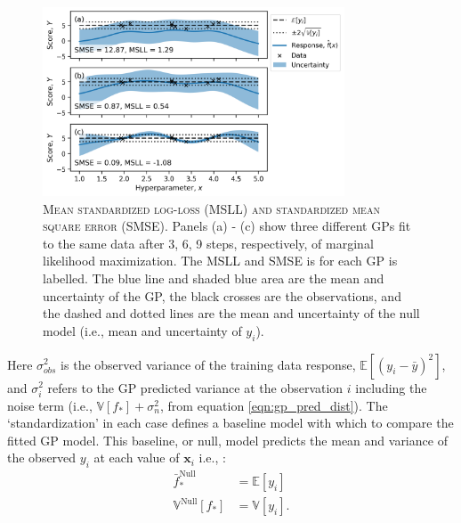 \begin{figure}
    \centering

    \includegraphics[width=0.8\textwidth]{chapters/msm_optimization/figures/gp_metric_explainer.png}
    \caption[Mean standardized log-loss (MSLL) and standardized mean square error (SMSE)]{\textsc{Mean standardized log-loss (MSLL) and standardized mean square error (SMSE)}. Panels (a) - (c) show three different GPs fit to the same data after 3, 6, 9 steps, respectively, of marginal likelihood maximization. The MSLL and SMSE is for each GP is labelled. The blue line and shaded blue area are the mean and uncertainty of the GP, the black crosses are the observations, and the dashed and dotted lines are the mean and uncertainty of the null model (i.e., mean and uncertainty of $y_{i}$).}
    \label{fig:msm_gp_metric_explainer}
\end{figure}

Here $\sigma_{obs}^{2}$ is the observed variance of the training data response, $\mathbb{E}\left[(y_{i}-\bar{y})^{2}\right]$, and $\sigma_{i}^{2}$ refers to the GP predicted variance at the observation $i$ including the noise term (i.e., $\mathbb{V}\left[f_{*}\right]+\sigma_{n}^{2}$, from equation \ref{eqn:gp_pred_dist}).  The `standardization' in each case defines a baseline model with which to compare the fitted GP model. This baseline, or null, model predicts the mean and variance of the observed $y_{i}$ at each value of $\mathbf{x}_{i}$ i.e., \cite{rasmussenGaussianProcessesMachine2006}:
\begin{align}
\bar{f}^{\mathrm{Null}}_{*} &= \mathbb{E}\left[y_{i}\right] \label{eqn:gp_null1} \\ 
\mathbb{V}^{\mathrm{Null}}\left[f_{*}\right] &= \mathbb{V}\left[y_{i}\right]. \label{eqn:gp_null2}
\end{align}

